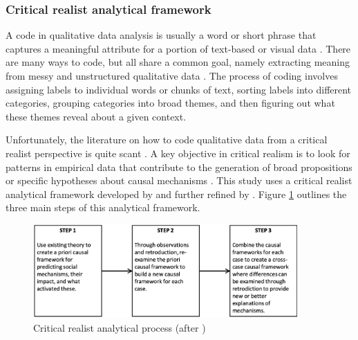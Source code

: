 \subsubsection{Critical realist analytical framework} \label{sss:cr_framewk}

A code in qualitative data analysis is usually a word or short phrase that captures a meaningful attribute for a portion of text-based or visual data \citep{saldana2015coding}. There are many ways to code, but all share a common goal, namely extracting meaning from messy and unstructured qualitative data \citep{richards2012readme}. The process of coding involves assigning labels to individual words or chunks of text, sorting labels into different categories, grouping categories into broad themes, and then figuring out what these themes reveal about a given context. \medskip

Unfortunately, the literature on how to code qualitative data from a critical realist perspective is quite scant \citep{fletcher2017applying}. A key objective in critical realism is to look for patterns in empirical data that contribute to the generation of broad propositions or specific hypotheses about causal mechanisms \citep{zachariadis2013methodological}. This study uses a critical realist analytical framework developed by \cite{bygstad2016identifying} and further refined by \citet{mcavoy2018critical}. Figure \ref{fig:cr_steps} outlines the three main steps of this analytical framework. \medskip
 
\begin{figure}
\centering
\includegraphics[width = 0.9\textwidth,
height = 0.7\textheight, keepaspectratio]{Images/cr_steps.png}
\caption{Critical realist analytical process (after \cite{mcavoy2018critical})}
\label{fig:cr_steps}
\end{figure}

